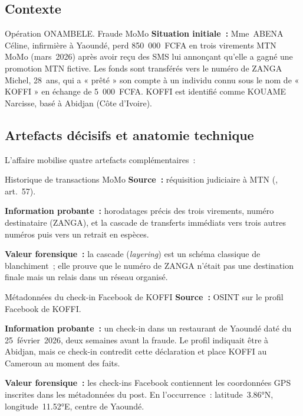 \subsection{Contexte}

\begin{boxscenario}{Opération ONAMBELE. Fraude MoMo}
\textbf{Situation initiale~:} Mme~ABENA Céline, infirmière à Yaoundé,
perd 850~000~FCFA en trois virements MTN MoMo (mars~2026) après avoir reçu
des SMS lui annonçant qu'elle a gagné une promotion MTN fictive. Les fonds
sont transférés vers le numéro de ZANGA Michel, 28~ans, qui a « prêté » son
compte à un individu connu sous le nom de « KOFFI » en échange de
5~000~FCFA. KOFFI est identifié comme KOUAME Narcisse, basé à Abidjan
(Côte d'Ivoire).
\end{boxscenario}

\subsection{Artefacts décisifs et anatomie technique}

L'affaire mobilise quatre artefacts complémentaires~:

\begin{boxartefact}{Historique de transactions MoMo}
\textbf{Source~:} réquisition judiciaire à MTN (, art.~57).

\textbf{Information probante~:} horodatages précis des trois virements,
numéro destinataire (ZANGA), et la cascade de transferts immédiats vers
trois autres numéros puis vers un retrait en espèces.

\textbf{Valeur forensique~:} la cascade (\textit{layering}) est un
schéma classique de blanchiment~; elle prouve que le numéro de ZANGA
n'était pas une destination finale mais un relais dans un réseau organisé.
\end{boxartefact}

\begin{boxartefact}{Métadonnées du check-in Facebook de KOFFI}
\textbf{Source~:} OSINT sur le profil Facebook de KOFFI.

\textbf{Information probante~:} un check-in dans un restaurant de Yaoundé
daté du 25~février~2026, deux semaines avant la fraude. Le profil indiquait
être à Abidjan, mais ce check-in contredit cette déclaration et place KOFFI
au Cameroun au moment des faits.

\textbf{Valeur forensique~:} les check-ins Facebook contiennent les
coordonnées GPS inscrites dans les métadonnées du post. En l'occurrence~:
latitude~3.86°N, longitude~11.52°E, centre de Yaoundé.
\end{boxartefact}


